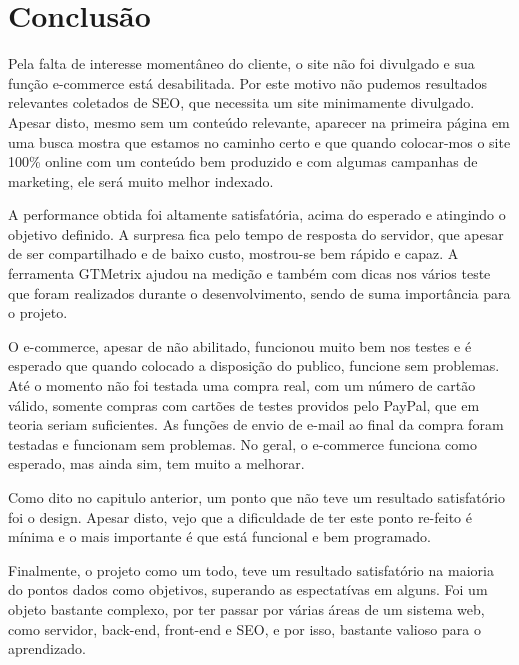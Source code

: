 \chapter{Conclusão}

Pela falta de interesse momentâneo do cliente, o site não foi divulgado e sua função e-commerce está desabilitada. Por este motivo não pudemos resultados relevantes coletados de SEO, que necessita um site minimamente divulgado. Apesar disto, mesmo sem um conteúdo relevante, aparecer na primeira página em uma busca mostra que estamos no caminho certo e que quando colocar-mos o site 100\% online com um conteúdo bem produzido e com algumas campanhas de marketing, ele será muito melhor indexado.

A performance obtida foi altamente satisfatória, acima do esperado e atingindo o objetivo definido. A surpresa fica pelo tempo de resposta do servidor, que apesar de ser compartilhado e de baixo custo, mostrou-se bem rápido e capaz. A ferramenta GTMetrix ajudou na medição e também com dicas nos vários teste que foram realizados durante o desenvolvimento, sendo de suma importância para o projeto.

O e-commerce, apesar de não abilitado, funcionou muito bem nos testes e é esperado que quando colocado a disposição do publico, funcione sem problemas. Até o momento não foi testada uma compra real, com um número de cartão válido, somente compras com cartões de testes providos pelo PayPal, que em teoria seriam suficientes. As funções de envio de e-mail ao final da compra foram testadas e funcionam sem problemas. No geral, o e-commerce funciona como esperado, mas ainda sim, tem muito a melhorar.

Como dito no capitulo anterior, um ponto que não teve um resultado satisfatório foi o design. Apesar disto, vejo que a dificuldade de ter este ponto re-feito é mínima e o mais importante é que está funcional e bem programado.

Finalmente, o projeto como um todo, teve um resultado satisfatório na maioria do pontos dados como objetivos, superando as espectatívas em alguns. Foi um objeto bastante complexo, por ter passar por várias áreas de um sistema web, como servidor, back-end, front-end e SEO, e por isso, bastante valioso para o aprendizado.
